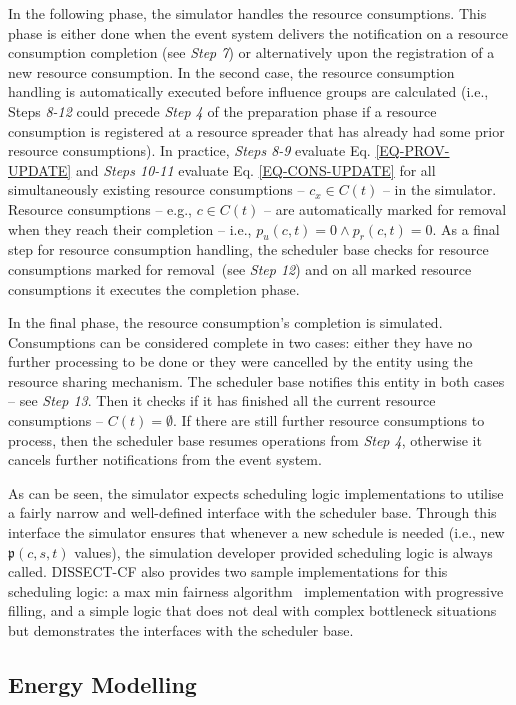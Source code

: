 \documentclass[sort, compress, 5p]{elsarticle}
\begin{document}
In the following phase, the simulator handles the resource consumptions. This phase is either done when the event system delivers the notification on a resource consumption completion (see \emph{Step 7}) or alternatively upon the registration of a new resource consumption. In the second case, the resource consumption handling is automatically executed before influence groups are calculated (i.e., Steps \emph{8-12} could precede \emph{Step 4} of the preparation phase if a resource consumption is registered at a resource spreader that has already had some prior resource consumptions). In practice, \emph{Steps 8-9} evaluate Eq. \ref{EQ-PROV-UPDATE} and \emph{Steps 10-11} evaluate Eq. \ref{EQ-CONS-UPDATE} for all simultaneously existing resource consumptions -- $c_x\in C(t)$ -- in the simulator. Resource consumptions -- e.g., $c\in C(t)$ -- are automatically marked for removal when they reach their completion -- i.e., $p_u(c,t)=0 \land p_r(c,t)=0$. As a final step for resource consumption handling, the scheduler base checks for resource consumptions marked for removal~(see \emph{Step 12}) and on all marked resource consumptions it executes the completion phase. 

In the final phase, the resource consumption's completion is simulated. Consumptions can be considered complete in two cases: either they have no further processing to be done or they were cancelled by the entity using the resource sharing mechanism. The scheduler base notifies this entity in both cases  -- see \emph{Step 13}. Then it checks if it has finished all the current resource consumptions -- $C(t)=\emptyset$. If there are still further resource consumptions to process, then the scheduler base resumes operations from \emph{Step 4}, otherwise it cancels further notifications from the event system.

As can be seen, the simulator expects scheduling logic implementations to utilise a fairly narrow and well-defined interface with the scheduler base. Through this interface the simulator ensures that whenever a new schedule is needed (i.e., new $\mathfrak{p}(c,s,t)$ values), the simulation developer provided scheduling logic is always called. DISSECT-CF also provides two sample implementations for this scheduling logic: a max min fairness algorithm~\cite{MaxMinFair} implementation with progressive filling, and a simple logic that does not deal with complex bottleneck situations but demonstrates the interfaces with the scheduler base.

\subsection{Energy Modelling} \label{Sec-EnergyModel}
\end{document}
